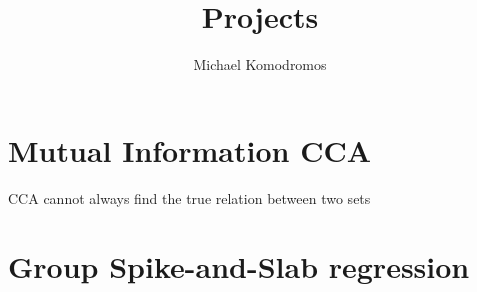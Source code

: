 \documentclass[12pt,twoside]{article}
\author{Michael Komodromos}
\title{Projects}
\begin{document}
   

\section{Mutual Information CCA}

CCA cannot always find the true relation between two sets

\section{Group Spike-and-Slab regression}
\end{document}
